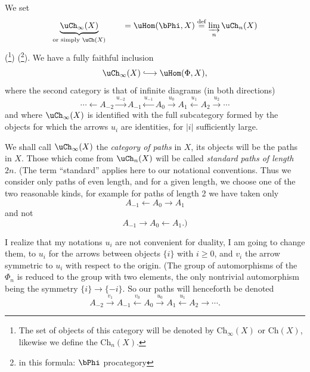 We set
\[
\underbrace{\uCh_\infty(X)}_{\text{or simply }\uCh(X)}\qquad=\uHom(\bPhi,X)\overset{\text{def}}{=}\varinjlim_n\uCh_n(X)
\]
(\footnote{The set of objects of this category will be denoted by $\mathrm{Ch}_\infty(X)$ or $\mathrm{Ch}(X)$, likewise we define the $\mathrm{Ch}_n(X)$.}) (\footnote{in this formula: $\bPhi$ procategory}). We have a fully faithful inclusion
\[
\uCh_\infty(X)\lhook\joinrel\longrightarrow\uHom(\Phi,X),
\]
where the second category is that of infinite diagrams (in both directions)
\[
\cdots\longleftarrow A_{-2}\xrightarrow{u_{-2}}A_{-1}\xleftarrow{u_{-1}}A_0\xrightarrow{u_0}A_1\xleftarrow{u_1}A_2\xrightarrow{u_2}\cdots
\]
and where $\uCh_\infty(X)$ is identified with the full subcategory formed by the objects for which the arrows $u_i$ are identities, for $|i|$ sufficiently large. %

We shall call $\uCh_\infty(X)$ the \textit{category of paths} in $X$, its objects will be the paths in $X$. Those which come from $\uCh_n(X)$ will be called \textit{standard paths of length} $2n$. (The term ``standard'' applies here to our notational conventions. Thus we consider only paths of even length, and for a given length, we choose one of the two reasonable kinds, for example for paths of length 2 we have taken only
\[
A_{-1}\longleftarrow A_0\longrightarrow A_1
\]
and not
\[
A_{-1}\longrightarrow A_0\longleftarrow A_1.)
\]

I realize that my notations $u_i$ are not convenient for duality, I am going to change them, to $u_i$ for the arrows between objects $\{i\}$ with $i\ge0$, and $v_i$ the arrow symmetric to $u_i$ with respect to the origin. (The group of automorphisms of the $\Phi_n$ is reduced to the group with two elements, the only nontrivial automorphism being the symmetry $\{i\}\longrightarrow\{-i\}$. So our paths will henceforth be denoted %
\[
A_{-2}\xrightarrow{v_1}A_{-1}\xleftarrow{v_0}A_0\xrightarrow{u_0}A_1\xleftarrow{u_1}A_2\longrightarrow\cdots.
\tag*{$(*)$}
\]